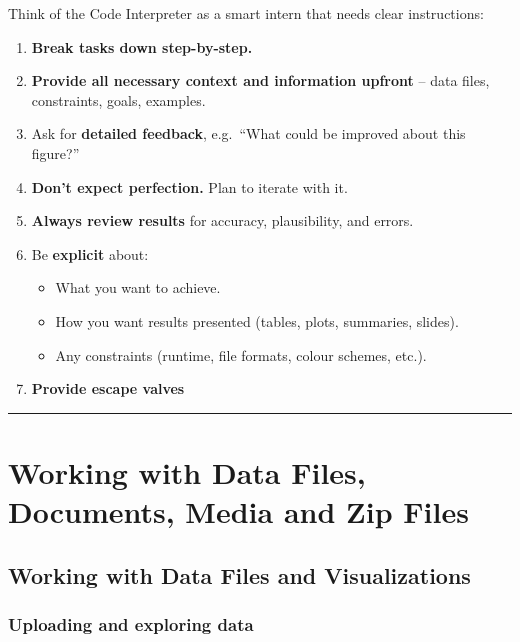 \documentclass[
  letterpaper,
  DIV=11,
  numbers=noendperiod]{scrreprt}
\providecommand{\tightlist}{%
  \setlength{\itemsep}{0pt}\setlength{\parskip}{0pt}}
\begin{document}
Think of the Code Interpreter as a smart intern that needs clear
instructions:

\begin{enumerate}
\def\labelenumi{\arabic{enumi}.}
\tightlist
\item
  \textbf{Break tasks down step-by-step.}
\item
  \textbf{Provide all necessary context and information upfront} -- data
  files, constraints, goals, examples.
\item
  Ask for \textbf{detailed feedback}, e.g.~``What could be improved
  about this figure?''
\item
  \textbf{Don't expect perfection.} Plan to iterate with it.
\item
  \textbf{Always review results} for accuracy, plausibility, and errors.
\item
  Be \textbf{explicit} about:

  \begin{itemize}
  \tightlist
  \item
    What you want to achieve.
  \item
    How you want results presented (tables, plots, summaries, slides).
  \item
    Any constraints (runtime, file formats, colour schemes, etc.).
  \end{itemize}
\item
  \textbf{Provide escape valves}
\end{enumerate}

\begin{center}\rule{0.5\linewidth}{0.5pt}\end{center}

\section{Working with Data Files, Documents, Media and Zip
Files}\label{working-with-data-files-documents-media-and-zip-files}

\subsection{Working with Data Files and
Visualizations}\label{working-with-data-files-and-visualizations}

\subsubsection{Uploading and exploring
data}\label{uploading-and-exploring-data}
\end{document}
